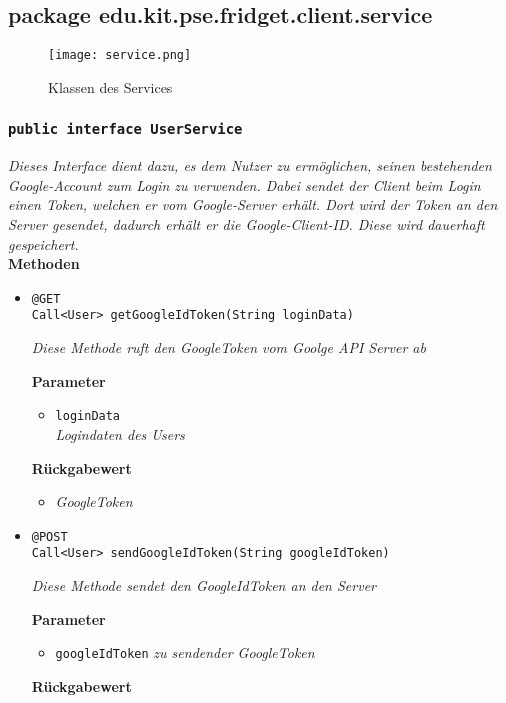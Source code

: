 
\subsection{package edu.kit.pse.fridget.client.service}
\begin{figure}[H]
	       \centering
	       \texttt{[image: service.png]}
	       \caption{Klassen des Services}
	      \end{figure}	
	\subsubsection{\texttt{public interface UserService}}
\textit{Dieses Interface dient dazu, es dem Nutzer zu ermöglichen, seinen bestehenden Google-Account zum Login zu verwenden. Dabei sendet der Client beim Login einen Token, welchen er vom Google-Server erhält. Dort wird der Token an den Server gesendet, dadurch erhält er die Google-Client-ID. Diese wird dauerhaft gespeichert.}\\

	\textbf{Methoden}
		\begin{itemize}
		\item\texttt{{@GET\\ Call<User> getGoogleIdToken(String loginData)}}

		\textit{Diese Methode ruft den GoogleToken vom Goolge API Server ab}

		\textbf{Parameter}
		\begin{itemize}
			\item\texttt{loginData}\\
			\textit{Logindaten des Users}
		\end{itemize}

		\textbf{Rückgabewert}
		\begin{itemize}
			\item\textit{GoogleToken}
		\end{itemize}

      \item\texttt{{@POST\\ Call<User> sendGoogleIdToken(String googleIdToken)}}

		\textit{Diese Methode sendet den GoogleIdToken an den Server}

		\textbf{Parameter}
		\begin{itemize}
			\item\texttt{googleIdToken}
			\textit{zu sendender GoogleToken}
		\end{itemize}
	
		\textbf{Rückgabewert}
	

	 \end{itemize}

